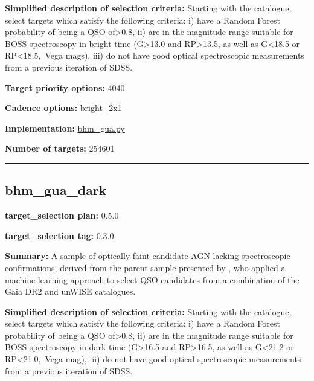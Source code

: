 \noindent\textbf{Simplified description of selection criteria:} Starting with the
\citet{Shu2019} catalogue, select targets which satisfy the following
criteria: i) have a Random Forest probability of being a QSO
of\textgreater{}0.8, ii) are in the magnitude range suitable for BOSS
spectroscopy in bright time (G\textgreater{}13.0 and
RP\textgreater{}13.5, as well as G\textless{}18.5 or
RP\textless{}18.5,~Vega mags), iii) do not have good optical
spectroscopic measurements from a previous iteration of SDSS.


\noindent\textbf{Target priority options:} 4040

\noindent\textbf{Cadence options:} bright\_2x1

\noindent\textbf{Implementation:}
\href{https://github.com/sdss/target_selection/blob/0.3.0/python/target_selection/cartons/bhm_gua.py}{bhm\_gua.py}

\noindent\textbf{Number of targets:} 254601

\begin{center}\rule{0.5\linewidth}{0.5pt}\end{center}

\hypertarget{bhm_gua_dark_plan0.5.0}{%
\subsection{bhm\_gua\_dark}\label{bhm_gua_dark_plan0.5.0}}

\noindent\textbf{target\_selection plan:} 0.5.0

\noindent\textbf{target\_selection tag:}
\href{https://github.com/sdss/target_selection/tree/0.3.0/}{0.3.0}

\noindent\textbf{Summary:} A sample of optically faint candidate AGN lacking
spectroscopic confirmations, derived from the parent sample presented by
\citet{Shu2019}, who applied a machine-learning approach to select QSO
candidates from a combination of the Gaia DR2 and unWISE catalogues.

\noindent\textbf{Simplified description of selection criteria:} Starting with the
\citet{Shu2019} catalogue, select targets which satisfy the following
criteria: i) have a Random Forest probability of being a QSO
of\textgreater{}0.8, ii) are in the magnitude range suitable for BOSS
spectroscopy in dark time (G\textgreater{}16.5 and RP\textgreater{}16.5,
as well as G\textless{}21.2 or RP\textless{}21.0,~Vega mag), iii) do not
have good optical spectroscopic measurements from a previous iteration
of SDSS.


